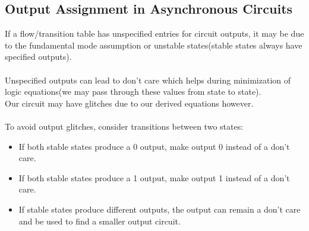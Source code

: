 \documentclass[12pt]{report}
\begin{document}
		\subsection{Output Assignment in Asynchronous Circuits}
			If a flow/transition table has unspecified entries for circuit outputs, it may be due to the fundamental mode assumption or unstable states(stable states always have specified outputs).\\
			\\
			Unspecified outputs can lead to don't care which helps during minimization of logic equations(we may pass through these values from state to state).\\
			Our circuit may have glitches due to our derived equations however.\\
			\\
			To avoid output glitches, consider transitions between two states:
			\begin{itemize}
				\item If both stable states produce a 0 output, make output 0 instead of a don't care.
				\item If both stable states produce a 1 output, make output 1 instead of a don't care.
				\item If stable states produce different outputs, the output can remain a don't care and be used to find a smaller output circuit.
			\end{itemize}
\end{document}
